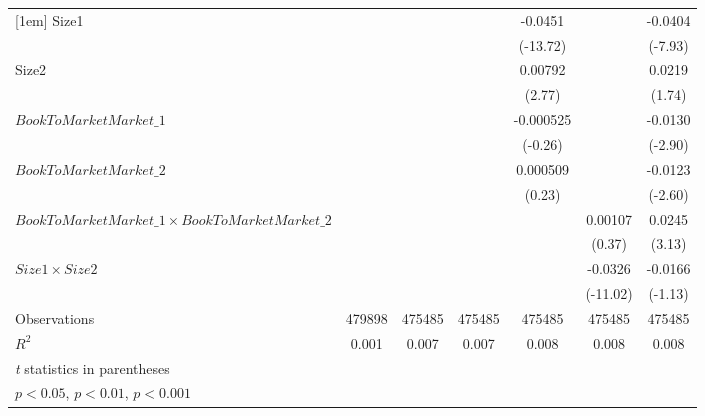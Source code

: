 {\begin{tabular}{l*{6}{c}}
[1em]
Size1               &                     &                     &                     &     -0.0451\sym{***}&                     &     -0.0404\sym{***}\\
                    &                     &                     &                     &    (-13.72)         &                     &     (-7.93)         \\
[1em]
Size2               &                     &                     &                     &     0.00792\sym{**} &                     &      0.0219         \\
                    &                     &                     &                     &      (2.77)         &                     &      (1.74)         \\
[1em]
$ BookToMarketMarket\_1 $&                     &                     &                     &   -0.000525         &                     &     -0.0130\sym{**} \\
                    &                     &                     &                     &     (-0.26)         &                     &     (-2.90)         \\
[1em]
$ BookToMarketMarket\_2 $&                     &                     &                     &    0.000509         &                     &     -0.0123\sym{**} \\
                    &                     &                     &                     &      (0.23)         &                     &     (-2.60)         \\
[1em]
$ BookToMarketMarket\_1 \times BookToMarketMarket\_2 $&                     &                     &                     &                     &     0.00107         &      0.0245\sym{**} \\
                    &                     &                     &                     &                     &      (0.37)         &      (3.13)         \\
[1em]
$ Size1 \times Size2 $&                     &                     &                     &                     &     -0.0326\sym{***}&     -0.0166         \\
                    &                     &                     &                     &                     &    (-11.02)         &     (-1.13)         \\
\hline
Observations        &      479898         &      475485         &      475485         &      475485         &      475485         &      475485         \\
\(R^{2}\)           &       0.001         &       0.007         &       0.007         &       0.008         &       0.008         &       0.008         \\
\hline\hline
\multicolumn{7}{l}{\footnotesize \textit{t} statistics in parentheses}\\
\multicolumn{7}{l}{\footnotesize \sym{*} \(p<0.05\), \sym{**} \(p<0.01\), \sym{***} \(p<0.001\)}\\
\end{tabular}
}
